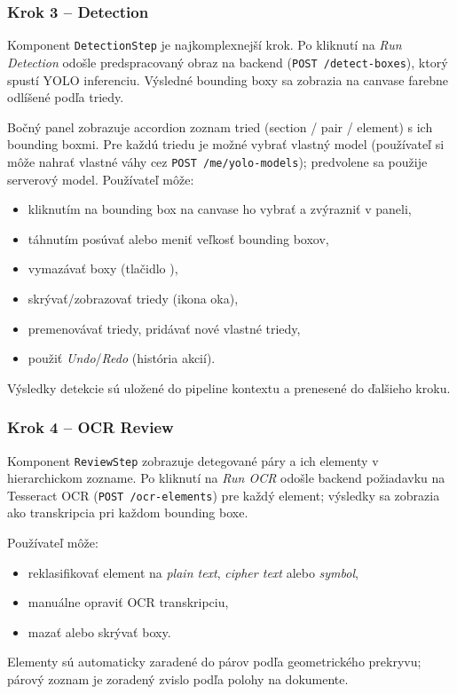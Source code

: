 \subsubsection{Krok 3 – Detection}

Komponent \texttt{DetectionStep} je najkomplexnejší krok. Po kliknutí na \textit{Run Detection} odošle predspracovaný obraz na backend (\texttt{POST /detect-boxes}), ktorý spustí YOLO inferenciu. Výsledné bounding boxy sa zobrazia na canvase farebne odlíšené podľa triedy.

Bočný panel zobrazuje accordion zoznam tried (section / pair / element) s ich bounding boxmi. Pre každú triedu je možné vybrať vlastný model (používateľ si môže nahrať vlastné váhy cez \texttt{POST /me/yolo-models}); predvolene sa použije serverový model. Používateľ môže:
\begin{itemize}
    \item kliknutím na bounding box na canvase ho vybrať a zvýrazniť v paneli,
    \item táhnutím posúvať alebo meniť veľkosť bounding boxov,
    \item vymazávať boxy (tlačidlo \faTrash),
    \item skrývať/zobrazovať triedy (ikona oka),
    \item premenovávať triedy, pridávať nové vlastné triedy,
    \item použiť \textit{Undo}/\textit{Redo} (história akcií).
\end{itemize}
Výsledky detekcie sú uložené do pipeline kontextu a prenesené do ďalšieho kroku.


\subsubsection{Krok 4 – OCR Review}

Komponent \texttt{ReviewStep} zobrazuje detegované páry a ich elementy v hierarchickom zozname. Po kliknutí na \textit{Run OCR} odošle backend požiadavku na Tesseract OCR (\texttt{POST /ocr-elements}) pre každý element; výsledky sa zobrazia ako transkripcia pri každom bounding boxe.

Používateľ môže:
\begin{itemize}
    \item reklasifikovať element na \textit{plain text}, \textit{cipher text} alebo \textit{symbol},
    \item manuálne opraviť OCR transkripciu,
    \item mazať alebo skrývať boxy.
\end{itemize}
Elementy sú automaticky zaradené do párov podľa geometrického prekryvu; párový zoznam je zoradený zvislo podľa polohy na dokumente.

